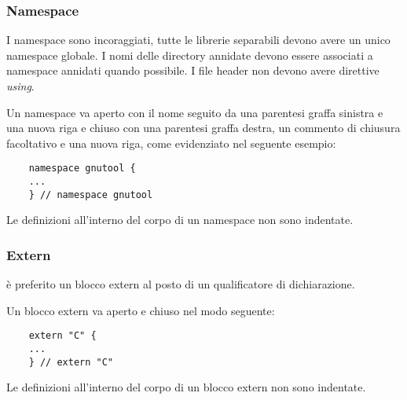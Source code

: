 \documentclass[../NomeDocumento.tex]{subfiles}
\begin{document}
	\subsubsection{Namespace} 
	I namespace sono incoraggiati, tutte le librerie separabili devono avere un unico namespace globale. I nomi delle directory annidate devono essere associati a namespace annidati quando possibile. I file header non devono avere direttive \textit{using}.
	
	\noindent Un namespace va aperto con il nome seguito da una parentesi graffa sinistra e una nuova riga e chiuso con una parentesi graffa destra, un commento di chiusura facoltativo e una nuova riga, come evidenziato nel seguente esempio:
	
	\begin{verbatim}
	namespace gnutool {
	...
	} // namespace gnutool
	\end{verbatim}
	
	\noindent Le definizioni all'interno del corpo di un namespace non sono indentate.
	
	\subsubsection{Extern} è preferito un blocco extern al posto di un qualificatore di dichiarazione.
	
	\noindent Un blocco extern va aperto e chiuso nel modo seguente:
	
	\begin{verbatim}
	extern "C" {
	...
	} // extern "C"
	\end{verbatim}
	
	\noindent Le definizioni all'interno del corpo di un blocco extern non sono indentate.
\end{document}
